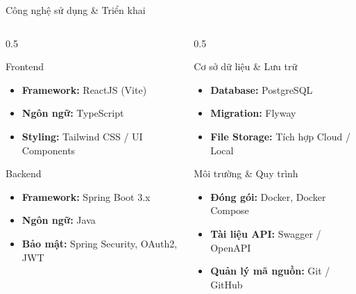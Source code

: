 \documentclass[10pt]{beamer}
\begin{document}
\begin{frame}{Công nghệ sử dụng \& Triển khai}
    \begin{columns}[T]
        \begin{column}{0.5\textwidth}
            \begin{block}{Frontend}
                \begin{itemize}
                    \item \textbf{Framework:} ReactJS (Vite)
                    \item \textbf{Ngôn ngữ:} TypeScript
                    \item \textbf{Styling:} Tailwind CSS / UI Components
                \end{itemize}
            \end{block}
            \begin{block}{Backend}
                \begin{itemize}
                    \item \textbf{Framework:} Spring Boot 3.x
                    \item \textbf{Ngôn ngữ:} Java
                    \item \textbf{Bảo mật:} Spring Security, OAuth2, JWT
                \end{itemize}
            \end{block}
        \end{column}
        
        \begin{column}{0.5\textwidth}
            \begin{block}{Cơ sở dữ liệu \& Lưu trữ}
                \begin{itemize}
                    \item \textbf{Database:} PostgreSQL
                    \item \textbf{Migration:} Flyway
                    \item \textbf{File Storage:} Tích hợp Cloud / Local
                \end{itemize}
            \end{block}
            \begin{block}{Môi trường \& Quy trình}
                \begin{itemize}
                    \item \textbf{Đóng gói:} Docker, Docker Compose
                    \item \textbf{Tài liệu API:} Swagger / OpenAPI
                    \item \textbf{Quản lý mã nguồn:} Git / GitHub
                \end{itemize}
            \end{block}
        \end{column}
    \end{columns}
\end{frame}
\end{document}
